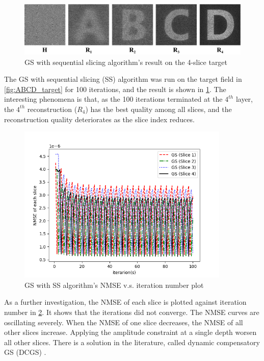 \begin{figure}[H]
  \centering
  \includegraphics[width=1.0\textwidth]{ABCD/GS_SS_ABCD.pdf}
  \caption{GS with sequential slicing algorithm's result on the 4-slice target}
  \label{fig:GS_SS_ABCD}
\end{figure}

The GS with sequential slicing (SS) algorithm was run on the target field in \cref{fig:ABCD_target} for 100 iterations, and the result is shown in \cref{fig:GS_SS_ABCD}. The interesting phenomena is that, as the 100 iterations terminated at the $4^{th}$ layer, the $4^{th}$ reconstruction ($R_4$) has the best quality among all slices, and the reconstruction quality deteriorates as the slice index reduces.

\begin{figure}[H]
  \centering
  \includegraphics[width=0.9\textwidth]{ABCD/Each_slice_GS.png}
  \caption{GS with SS algorithm's NMSE v.s. iteration number plot}
  \label{fig:Each_slice_GS}
\end{figure}

As a further investigation, the NMSE of each slice is plotted against iteration number in \cref{fig:Each_slice_GS}. It shows that the iterations did not converge. The NMSE curves are oscillating severely. When the NMSE of one slice decreases, the NMSE of all other slices increase. Applying the amplitude constraint at a single depth worsen all other slices. There is a solution in the literature, called dynamic compensatory GS (DCGS) \cite{Zhou2019}.

